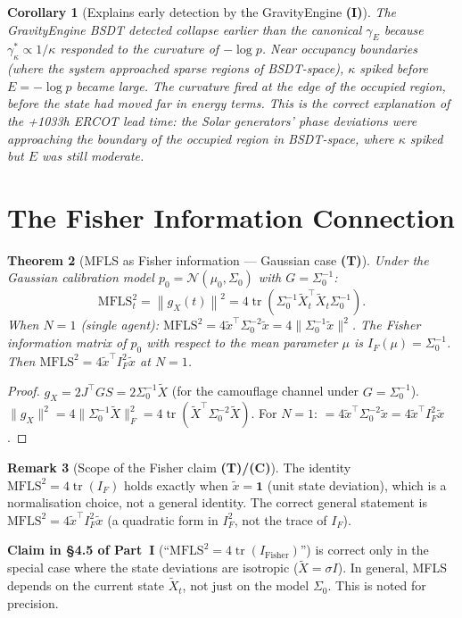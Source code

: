\documentclass[11pt,a4paper]{article}
\newtheorem{theorem}{Theorem}[section]
\newtheorem{corollary}[theorem]{Corollary}
\theoremstyle{definition}
\newtheorem{remark}[theorem]{Remark}
\newcommand{\norm}[1]{\left\|#1\right\|}
\newcommand{\gX}{g_X}
\begin{document}
\begin{corollary}[Explains early detection by the GravityEngine \textbf{(I)}]
The GravityEngine BSDT detected collapse earlier than the canonical $\gamma_E$
because $\gamma^*_\kappa \propto 1/\kappa$ responded to the curvature of $-\log p$.
Near occupancy boundaries (where the system approached sparse regions of
BSDT-space), $\kappa$ spiked before $E = -\log p$ became large.
The curvature fired \emph{at the edge of the occupied region},
before the state had moved far in energy terms.
This is the correct explanation of the +1033h ERCOT lead time:
the Solar generators' phase deviations were approaching the boundary of the
occupied region in BSDT-space, where $\kappa$ spiked but $E$ was still moderate.
\end{corollary}

\section{The Fisher Information Connection}
\label{sec:fisher}

\begin{theorem}[MFLS as Fisher information --- Gaussian case \textbf{(T)}]
\label{thm:mfls_fisher}
Under the Gaussian calibration model $p_0 = \mathcal{N}(\mu_0,\Sigma_0)$
with $G = \Sigma_0^{-1}$:
\[
\mathrm{MFLS}_t^2 = \norm{\gX(t)}^2 = 4\operatorname{tr}(\Sigma_0^{-1}\tilde X_t^\top\tilde X_t\Sigma_0^{-1}).
\]
When $N=1$ (single agent): $\mathrm{MFLS}^2 = 4\tilde x^\top\Sigma_0^{-2}\tilde x = 4\|\Sigma_0^{-1}\tilde x\|^2$.
The Fisher information matrix of $p_0$ with respect to the mean parameter $\mu$ is
$I_F(\mu) = \Sigma_0^{-1}$.
Then $\mathrm{MFLS}^2 = 4\tilde x^\top I_F^2\tilde x$ at $N=1$.
\end{theorem}

\begin{proof}
$\gX = 2J^\top GS = 2\Sigma_0^{-1}\tilde X$ (for the camouflage channel under $G=\Sigma_0^{-1}$).
$\|\gX\|^2 = 4\|\Sigma_0^{-1}\tilde X\|_F^2 = 4\operatorname{tr}(\tilde X^\top\Sigma_0^{-2}\tilde X)$.
For $N=1$: $= 4\tilde x^\top\Sigma_0^{-2}\tilde x = 4\tilde x^\top I_F^2\tilde x$.
\end{proof}

\begin{remark}[Scope of the Fisher claim \textbf{(T)/(C)}]
The identity $\mathrm{MFLS}^2 = 4\operatorname{tr}(I_F)$ holds exactly when
$\tilde x = \mathbf{1}$ (unit state deviation), which is a normalisation choice,
not a general identity. The correct general statement is
$\mathrm{MFLS}^2 = 4\tilde x^\top I_F^2\tilde x$ (a quadratic form in $I_F^2$,
not the trace of $I_F$).

\textbf{Claim in §4.5 of Part~I} (``$\mathrm{MFLS}^2 = 4\operatorname{tr}(I_\mathrm{Fisher})$'')
is correct only in the special case where the state deviations are isotropic
($\tilde X = \sigma I$). In general, MFLS depends on the current state $\tilde X_t$,
not just on the model $\Sigma_0$. This is noted for precision.
\end{remark}
\end{document}

